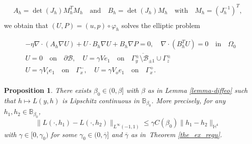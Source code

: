 \documentclass[10pt,a4paper]{amsart}
\newtheorem{proposition}{Proposition}
\begin{document}
\begin{equation}\label{matrices-diffeo}
\begin{aligned}
    A_h= \det(J_h) M_h^TM_h \quad \text{and} \quad B_h= \det(J_h) M_h \quad \text{with} \quad  M_h = (J_h^{-1})^T,\\[5pt]
\end{aligned}
\end{equation}we obtain that $(U,P)=(u, p)\circ \varphi_h$ solves the elliptic problem

\begin{equation}\label{BVprob_trans}
		\begin{aligned}
			&-\eta\nabla \cdot\left( A_h \nabla U \right)  +  U\cdot B_h\nabla U+ B_h\nabla P=0, \quad
			\nabla\cdot (B_h^TU)=0\quad\text{in}\quad \Omega_0\\[2pt]
			&U=0 \quad \text{on} \quad  \partial \mathcal{B} ,\quad U=\gamma Ve_1\quad \text{on} \quad \overline{\Gamma_{y}^\pm \setminus \mathcal{B}_{\pm 1}}\cup\Gamma_z^\pm\\[2pt]
			&U= \gamma V_ie_1\quad \text{on} \quad \Gamma_x^-,\quad U= \gamma V_oe_1\quad\text{on} \quad \Gamma_x^+.\\[5pt]
		\end{aligned}
	\end{equation}

\begin{proposition}\label{L-incre}
	There exists $\beta_0\in (0, \beta]$ with $\beta$ as in Lemma \ref{lemma-diffeo} such that $ h\mapsto L( y, h)$ is Lipschitz continuous in $\mathbb{B}_{\beta_0}$. More precisely, for any $h_1,h_2 \in \mathbb{B}_{\beta_0}$,
\begin{equation}\label{lip-lift}
    \|L(\cdot, h_1) - L(\cdot, h_2)\|_{L^\infty(-1,1)} \leq  \gamma C(\beta_0) \|h_1-h_2\|_{\mathbb{H}^4}
\end{equation}with $\gamma \in [0,\gamma_0)$ for some $\gamma_0\in(0,\overline{\gamma}]$ and $\overline{\gamma}$ as in Theorem \ref{the_ex_regu}.
\end{proposition}
\end{document}
